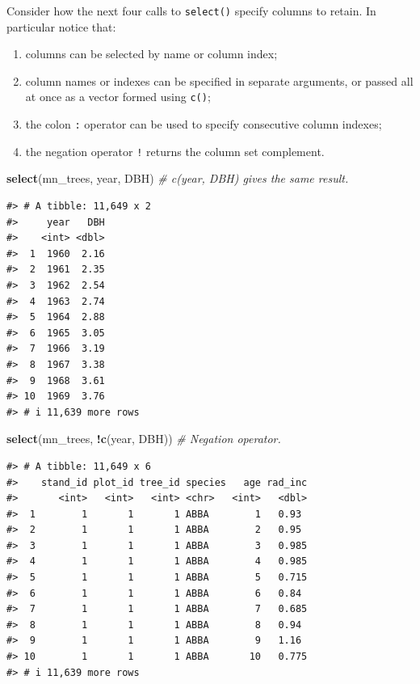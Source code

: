 \documentclass[
  11pt,
]{krantz}
\newenvironment{Shaded}{\begin{snugshade}}{\end{snugshade}}
\newcommand{\CommentTok}[1]{\textcolor[rgb]{0.56,0.35,0.01}{\textit{#1}}}
\newcommand{\KeywordTok}[1]{\textcolor[rgb]{0.13,0.29,0.53}{\textbf{#1}}}
\newcommand{\NormalTok}[1]{#1}
\newcommand{\OperatorTok}[1]{\textcolor[rgb]{0.81,0.36,0.00}{\textbf{#1}}}
\providecommand{\tightlist}{%
  \setlength{\itemsep}{0pt}\setlength{\parskip}{0pt}}
\theoremstyle{definition}
\theoremstyle{definition}
\theoremstyle{definition}
\theoremstyle{definition}
\theoremstyle{remark}
\begin{document}
Consider how the next four calls to \texttt{select()} specify columns to retain. In particular notice that:

\begin{enumerate}
\def\labelenumi{\arabic{enumi})}
\tightlist
\item
  columns can be selected by name or column index;
\item
  column names or indexes can be specified in separate arguments, or passed all at once as a vector formed using \texttt{c()};
\item
  the colon \texttt{:} operator can be used to specify consecutive column indexes;
\item
  the negation operator \texttt{!} returns the column set complement.
\end{enumerate}

\begin{Shaded}
\begin{Highlighting}[]
\KeywordTok{select}\NormalTok{(mn\_trees, year, DBH) }\CommentTok{\# c(year, DBH) gives the same result.}
\end{Highlighting}
\end{Shaded}

\begin{verbatim}
#> # A tibble: 11,649 x 2
#>     year   DBH
#>    <int> <dbl>
#>  1  1960  2.16
#>  2  1961  2.35
#>  3  1962  2.54
#>  4  1963  2.74
#>  5  1964  2.88
#>  6  1965  3.05
#>  7  1966  3.19
#>  8  1967  3.38
#>  9  1968  3.61
#> 10  1969  3.76
#> # i 11,639 more rows
\end{verbatim}

\begin{Shaded}
\begin{Highlighting}[]
\KeywordTok{select}\NormalTok{(mn\_trees, }\OperatorTok{!}\KeywordTok{c}\NormalTok{(year, DBH)) }\CommentTok{\# Negation operator.}
\end{Highlighting}
\end{Shaded}

\begin{verbatim}
#> # A tibble: 11,649 x 6
#>    stand_id plot_id tree_id species   age rad_inc
#>       <int>   <int>   <int> <chr>   <int>   <dbl>
#>  1        1       1       1 ABBA        1   0.93 
#>  2        1       1       1 ABBA        2   0.95 
#>  3        1       1       1 ABBA        3   0.985
#>  4        1       1       1 ABBA        4   0.985
#>  5        1       1       1 ABBA        5   0.715
#>  6        1       1       1 ABBA        6   0.84 
#>  7        1       1       1 ABBA        7   0.685
#>  8        1       1       1 ABBA        8   0.94 
#>  9        1       1       1 ABBA        9   1.16 
#> 10        1       1       1 ABBA       10   0.775
#> # i 11,639 more rows
\end{verbatim}
\end{document}
